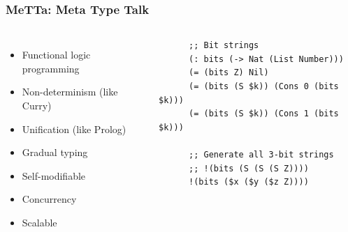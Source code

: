 \documentclass[aspectratio=169]{beamer}
\begin{document}
\begin{frame}[fragile]

  \frametitle{MeTTa: Meta Type Talk}

  \begin{columns}

    \column{7cm}
    \begin{itemize}
    \item Functional logic programming
    \item Non-determinism (like Curry)
    \item Unification (like Prolog)
    \item Gradual typing
    \item Self-modifiable
    \item Concurrency
    \item Scalable
    \end{itemize}

    \column{7cm}

    \begin{lstlisting}
      ;; Bit strings
      (: bits (-> Nat (List Number)))
      (= (bits Z) Nil)
      (= (bits (S $k)) (Cons 0 (bits $k)))
      (= (bits (S $k)) (Cons 1 (bits $k)))

      ;; Generate all 3-bit strings
      ;; !(bits (S (S (S Z))))
      !(bits ($x ($y ($z Z))))
    \end{lstlisting}


\end{columns}
\end{frame}
\end{document}
